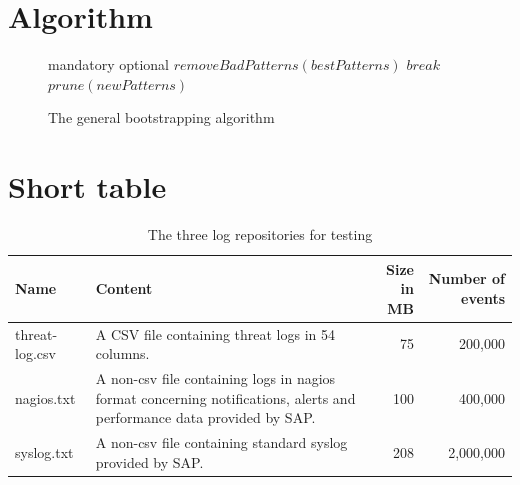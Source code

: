 \section{Algorithm}
\begin{figure}[h]
	\centering
	\begin{framed}
		\begin{algorithmic}[1]
			\Comment mandatory
			\Comment optional
			\Repeat
			\State $removeBadPatterns(bestPatterns)$
			\State $break$
			\EndIf
			\State $prune(newPatterns)$\label{line:prune}
		\end{algorithmic}
	\end{framed}
	\caption{The general bootstrapping algorithm}
	\label{fig:generalAlgo}
\end{figure}

\clearpage

\section{Short table}
\begin{table}[h]
	\centering
	\caption{The three log repositories for testing}
	\label{tab:threeRepos}
	\begin{footnotesize}
		\begin{tabularx}{1.0\textwidth}{|l|>{\raggedright}X|r|r|}
			\hline
			\textbf{Name} & \textbf{Content} & \textbf{Size in MB} & \textbf{Number of events} \\
			\hline
			threat-log.csv & A CSV file containing threat logs in 54 columns. & 75 & 200,000 \\
			\hline
			nagios.txt & A non-csv file containing logs in nagios format concerning notifications, alerts and performance data provided by SAP. & 100 & 400,000 \\
			\hline
			syslog.txt & A non-csv file containing standard syslog provided by SAP. & 208 & 2,000,000 \\
			\hline
		\end{tabularx}
	\end{footnotesize}
\end{table}

